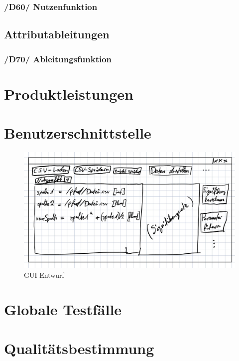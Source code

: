 \documentclass{article}
\begin{document}
\subsubsection*{/D60/ Nutzenfunktion}
\subsection{Attributableitungen}
\subsubsection*{/D70/ Ableitungsfunktion}

\section{Produktleistungen}

\section{Benutzerschnittstelle}
\begin{figure}[H]%
  \centering
  \includegraphics[width=12cm]{gui.jpeg}
  \caption{GUI Entwurf}
\end{figure}


\section{Globale Testfälle}

\section{Qualitätsbestimmung}
\end{document}
